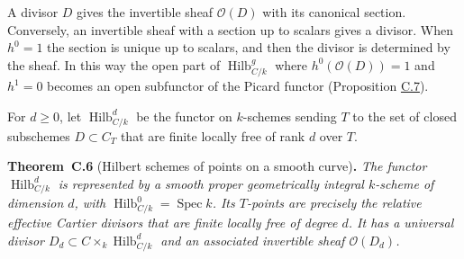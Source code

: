 \documentclass[11pt]{article}
\newenvironment{bpstatement}[2]{\par\addvspace{0.6\baselineskip}\noindent\textbf{#1}#2\textbf{.}\enspace\ignorespaces}
  {\par\addvspace{0.4\baselineskip}}
\newenvironment{bpstatementit}[2]{\begin{bpstatement}{#1}{#2}\itshape\ignorespaces}{\end{bpstatement}}
\begin{document}
A divisor \(D\) gives the invertible sheaf \(\mathcal O(D)\) with its canonical section. Conversely, an invertible sheaf with a section up to scalars gives a divisor. When \(h^0=1\) the section is unique up to scalars, and then the divisor is determined by the sheaf. In this way the open part of \(\operatorname{Hilb}^{g}_{C/k}\) where \(h^0(\mathcal O(D))=1\) and \(h^1=0\) becomes an open subfunctor of the Picard functor (Proposition \hyperref[bp24]{C.7}).

For \(d\geq0\), let \(\operatorname{Hilb}^d_{C/k}\) be the functor on \(k\)-schemes sending \(T\) to the set of closed subschemes \(D\subset C_T\) that are finite locally free of rank \(d\) over \(T\).

\label{bp21}%
\begin{bpstatementit}{Theorem~C.6}{ (Hilbert schemes of points on a smooth curve)}
The functor \(\operatorname{Hilb}^{d}_{C/k}\) is represented by a smooth proper geometrically integral \(k\)-scheme of dimension \(d\), with \(\operatorname{Hilb}^{0}_{C/k}=\operatorname{Spec}k\). Its \(T\)-points are precisely the relative effective Cartier divisors that are finite locally free of degree \(d\). It has a universal divisor \(D_d\subset C\times_k\operatorname{Hilb}^{d}_{C/k}\) and an associated invertible sheaf \(\mathcal O(D_d)\).
\end{bpstatementit}
\end{document}
